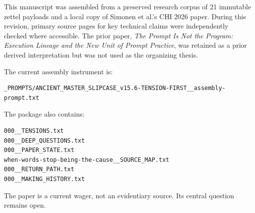 \documentclass[11pt]{article}
\begin{document}
This manuscript was assembled from a preserved research corpus of 21 immutable zettel payloads and a local copy of Simonen et al.'s CHI 2026 paper. During this revision, primary source pages for key technical claims were independently checked where accessible. The prior paper, \emph{The Prompt Is Not the Program: Execution Lineage and the New Unit of Prompt Practice}, was retained as a prior derived interpretation but was not used as the organizing thesis.

The current assembly instrument is:
\begin{verbatim}
_PROMPTS/ANCIENT_MASTER_SLIPCASE_v15.6-TENSION-FIRST__assembly-prompt.txt
\end{verbatim}

The package also contains:
\begin{verbatim}
000__TENSIONS.txt
000__DEEP_QUESTIONS.txt
000__PAPER_STATE.txt
when-words-stop-being-the-cause__SOURCE_MAP.txt
000__RETURN_PATH.txt
000__MAKING_HISTORY.txt
\end{verbatim}

The paper is a current wager, not an evidentiary source. Its central question remains open.
\end{document}
